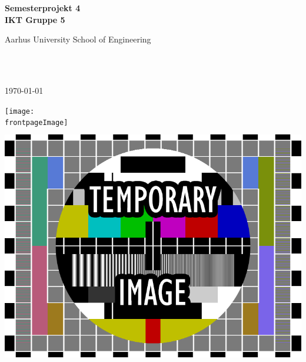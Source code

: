 \begin{center}
	{\fontsize{36pt}{0}\selectfont
		\textbf{
		Semesterprojekt 4\\
		IKT Gruppe 5\\
		}
	}
	\vspace{20pt}

	{\fontsize{14pt}{0}\selectfont
		Aarhus University School of Engineering\\
	}
	\vspace{20pt}

	{\fontsize{24pt}{0}\selectfont
		\thetitle\\
	}
	\vspace{20pt}

	{\fontsize{18pt}{0}\selectfont
		\ifdefined\frontpageDate
			\frontpageDate\\
		\else
			\today\\
		\fi
	}
	\vspace{20pt}

	\ifdefined\frontpageImage
		\texttt{[image: \\frontpageImage]}
	\else
		\includegraphics[width=\linewidth,height=300pt,keepaspectratio]{Forside.png}
	\fi
	\vspace*{\fill}


\end{center}
